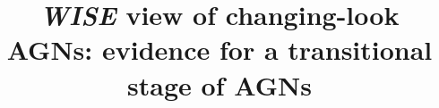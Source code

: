 \documentclass[linenumbers]{aastex631}
\begin{document}
\title{{\it WISE} view of changing-look AGNs: evidence for a transitional stage of AGNs}


\end{document}

